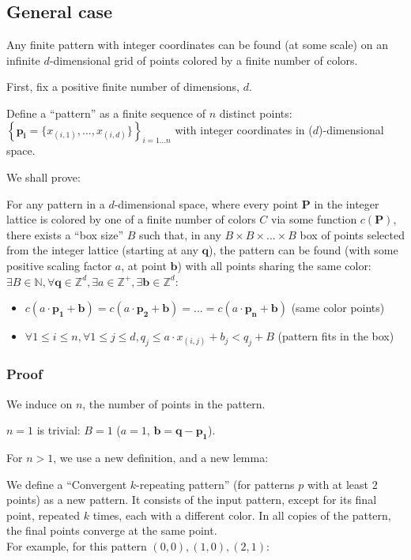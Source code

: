 \documentclass[11pt]{article}
\newcommand{\N}{\mathbb{N}}
\newcommand{\Z}{\mathbb{Z}}
\newcommand*{\scalePic}{0.4}
\newcommand*{\gridArg}[7]{%
    \foreach \x in {\fpeval{#1},\fpeval{#1+#2},...,\fpeval{#3+0.0001}} %
        \draw [black, thin, #7] (\x,\fpeval{#4}) -- (\x,\fpeval{#6+0.0001});
    \foreach \y in {\fpeval{#4},\fpeval{#4+#5},...,\fpeval{#6+0.0001}}
        \draw [black, thin, #7] (\fpeval{#1},\y) -- (\fpeval{#3+0.0001},\y);
}
\newcommand*{\grid}[6]{\gridArg{#1}{#2}{#3}{#4}{#5}{#6}{}}%
\newcommand*{\mybigbox}[4]{\grid{#1}{#3}{#1+#3}{#2}{#4}{#2+#4}} %
\newcommand*{\point}[3]{\node at (#1 + 0.5, #2 + 0.5)[circle, fill, inner sep=\scalePic*5pt, #3]{}; \gridArg{#1}{1}{#1+1}{#2}{1}{#2+1}{draw=none}}
\newcommand*{\blue}{blue!60!green}
\begin{document}
\pagebreak
\subsection*{General case}

Any finite pattern with integer coordinates can be found (at some scale) on an infinite $d$-dimensional grid of points colored by a finite number of colors.

First, fix a positive finite number of dimensions, $d$.

Define a ``pattern'' as a finite sequence of $n$ distinct points:\\
$\left\{\mathbf{p_i} = \{x_{(i,1)}, ..., x_{(i,d)}\}\right\}_{i=1...n}$ with integer coordinates in ($d$)-dimensional space.

We shall prove:

For any pattern in a $d$-dimensional space, where every point $\mathbf{P}$ in the integer lattice is colored by one of a finite number of colors $C$ via some function $c(\mathbf{P})$, there exists a ``box size'' $B$ such that, in any $B \times B \times ... \times B$ box of points selected from the integer lattice (starting at any $\mathbf{q}$), the pattern can be found (with some positive scaling factor $a$, at point $\mathbf{b}$) with all points sharing the same color:\\
$\exists B \in \N, \forall \mathbf{q} \in \Z^{d}, \exists a \in \Z^{+}, \exists \mathbf{b} \in \Z^{d}$:
\begin{itemize}
\item $c(a \cdot \mathbf{p_1} + \mathbf{b}) = c(a \cdot \mathbf{p_2} + \mathbf{b}) = ... = c(a \cdot \mathbf{p_n} + \mathbf{b})$ (same color points)
\item $\forall 1 \leq i \leq n, \forall 1 \leq j \leq d, q_j \leq a \cdot x_{(i,j)} + b_j < q_j + B$ (pattern fits in the box)
\end{itemize}


\subsubsection*{Proof}
We induce on $n$, the number of points in the pattern.

$n=1$ is trivial: $B=1$ ($a=1$, $\mathbf{b} = \mathbf{q} - \mathbf{p_1}$).

For $n>1$, we use a new definition, and a new lemma:

We define a ``Convergent $k$-repeating pattern'' (for patterns $p$ with at least $2$ points) as a new pattern. It consists of the input pattern, except for its final point, repeated $k$ times, each with a different color. In all copies of the pattern, the final points converge at the same point.\\
For example, for this pattern $(0,0), (1,0), (2,1)$:
\end{document}
